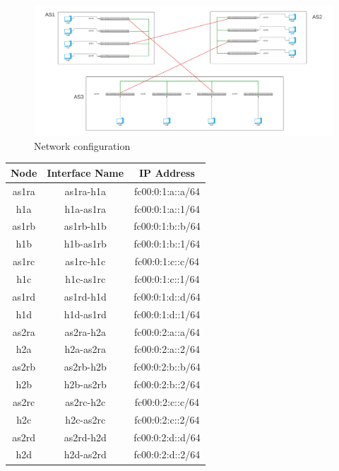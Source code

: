 \begin{figure}[h!t]
	\centering
        \includegraphics[width=\linewidth]{graphics/diagram.pdf}	
        \caption{Network configuration}
\end{figure}
\begin{table}[h!]
\centering
\begin{tabular}{|c|c|c|}
\hline
\textbf{Node} & \textbf{Interface Name} & \textbf{IP Address} \\
\hline
as1ra & as1ra-h1a & fc00:0:1:a::a/64 \\
h1a & h1a-as1ra & fc00:0:1:a::1/64 \\

as1rb & as1rb-h1b & fc00:0:1:b::b/64 \\
h1b & h1b-as1rb & fc00:0:1:b::1/64 \\

as1rc & as1rc-h1c & fc00:0:1:c::c/64 \\
h1c & h1c-as1rc & fc00:0:1:c::1/64 \\

as1rd & as1rd-h1d & fc00:0:1:d::d/64 \\
h1d & h1d-as1rd & fc00:0:1:d::1/64 \\

as2ra & as2ra-h2a & fc00:0:2:a::a/64 \\
h2a & h2a-as2ra & fc00:0:2:a::2/64 \\

as2rb & as2rb-h2b & fc00:0:2:b::b/64 \\
h2b & h2b-as2rb & fc00:0:2:b::2/64 \\

as2rc & as2rc-h2c & fc00:0:2:c::c/64 \\
h2c & h2c-as2rc & fc00:0:2:c::2/64 \\

as2rd & as2rd-h2d & fc00:0:2:d::d/64 \\
h2d & h2d-as2rd & fc00:0:2:d::2/64 \\


\end{tabular}
\end{table}
